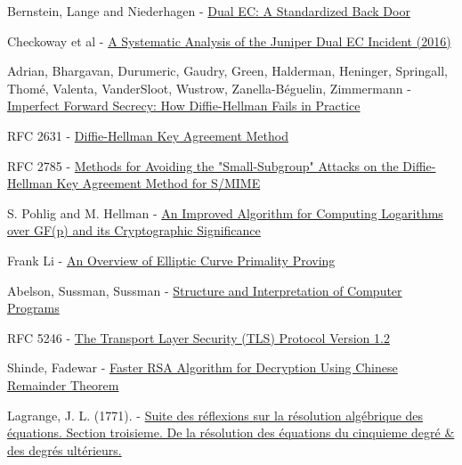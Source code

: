\documentclass[a4paper,11pt,twocolumn]{article}
\begin{document}
\begin{thebibliography}{1}

 Bernstein, Lange and Niederhagen - \href{https://eprint.iacr.org/2015/767.pdf}{Dual EC: A Standardized Back Door}

 Checkoway et al - \href{http://eprint.iacr.org/2016/376}{A Systematic Analysis of the Juniper Dual EC Incident (2016)}

 Adrian, Bhargavan, Durumeric, Gaudry, Green, Halderman, Heninger, Springall, Thomé, Valenta,  VanderSloot, Wustrow, Zanella-Béguelin, Zimmermann -  \href{https://weakdh.org/imperfect-forward-secrecy-ccs15.pdf}{Imperfect Forward Secrecy: How Diffie-Hellman Fails in Practice}

 RFC 2631 - \href{https://tools.ietf.org/html/rfc2631}{Diffie-Hellman Key Agreement Method}

 RFC 2785 - \href{https://tools.ietf.org/html/rfc2785}{Methods for Avoiding the "Small-Subgroup" Attacks on the Diffie-Hellman Key Agreement Method for S/MIME}

 S. Pohlig and M. Hellman - \href{http://www-ee.stanford.edu/~hellman/publications/28.pdf}{An Improved Algorithm for Computing Logarithms over GF(p) and its Cryptographic Significance}

 Frank Li - \href{http://theory.stanford.edu/~dfreeman/cs259c-f11/finalpapers/primalityproving.pdf}{An Overview of Elliptic Curve Primality Proving}

 Abelson, Sussman, Sussman -  \href{https://mitpress.mit.edu/sicp/chapter1/footnode.html#2413}{Structure and Interpretation of Computer Programs}

 RFC 5246 - \href{https://www.ietf.org/rfc/rfc5246.txt}{The Transport Layer Security (TLS) Protocol Version 1.2}

 Shinde, Fadewar -  \href{http://www.techscience.com/doi/10.3970/icces.2008.005.255.pdf}{Faster RSA Algorithm for Decryption Using Chinese Remainder Theorem}

 Lagrange, J. L. (1771). - \href{https://books.google.com/books?id=_-U_AAAAYAAJ&pg=PA138#v=onepage&q&f=false}{Suite des réflexions sur la résolution algébrique des équations. Section troisieme. De la résolution des équations du cinquieme degré & des degrés ultérieurs.}

\end{thebibliography}
\end{document}
